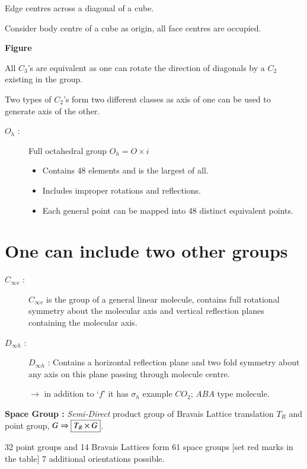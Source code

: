 Edge centres across a diagonal of a cube.

Consider body centre of a cube as origin, all face centres are occupied.
\begin{center}
{\bf Figure}
\end{center}

All $C_{3}$'s are equivalent as one can rotate the direction of diagonals by a $C_{2}$ existing in the group.

Two types of $C_{2}$'s form two different classes as axis of one can be used to generate axis of the other.
\begin{description}
\item[$O_{h}$ :] Full octahedral group $O_{h}=O\times i$
\begin{itemize}
\item Contains 48 elements and is the largest of all.

\item Includes improper rotations and reflections.

\item Each general point can be mapped into 48 distinct equivalent points.
\end{itemize}
\end{description}

\section*{One can include two other groups}
\begin{description}
\item[$C_{\infty v}$ :] $C_{\infty v}$ is the group of a general linear molecule, contains full rotational symmetry about the molecular axis and vertical reflection planes containing the molecular axis.

\item[$D_{\infty h}$ :] $D_{\infty h}$ : Contains a horizontal reflection plane and two fold symmetry about any axis on this plane passing through molecule centre.

$\to$ in addition to `$f$' it has $\sigma_{h}$ example $CO_{2}$; $ABA$ type molecule.
\end{description}

\noindent
{\bf Space Group :} {\em Semi-Direct} product group of Bravais Lattice translation $T_{R}$ and point group, $G\Rightarrow \fbox{$T_{R}\times G$}$.

32 point groups and 14 Bravais Lattices form 61 space groups [set red marks in the table] 7 additional orientations possible.

